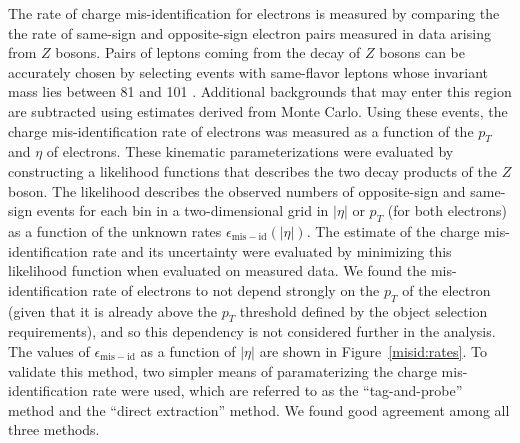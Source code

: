 The rate of charge mis-identification for electrons is measured by comparing the the rate of same-sign and opposite-sign electron pairs measured in data arising from $Z$ bosons.
Pairs of leptons coming from the decay of $Z$ bosons can be accurately chosen by selecting events with same-flavor leptons whose invariant mass lies between 81 \GeV{} and 101 \GeV{}.
Additional backgrounds that may enter this region are subtracted using estimates derived from Monte Carlo.
Using these events, the charge mis-identification rate of electrons was measured as a function of the $p_T$ and $\eta$ of electrons.
These kinematic parameterizations were evaluated by constructing a likelihood functions that describes the two decay products of the $Z$ boson.
The likelihood describes the observed numbers of opposite-sign and same-sign events for each bin in a two-dimensional grid in $|\eta|$ or $p_T$ (for both electrons) as a function of the unknown rates $\epsilon_{\mathrm{mis-id}}(|\eta|)$.
The estimate of the charge mis-identification rate and its uncertainty were evaluated by minimizing this likelihood function when evaluated on measured data.
We found the mis-identification rate of electrons to not depend strongly on the $p_T$ of the electron (given that it is already above the $p_T$ threshold defined by the object selection requirements), and so this dependency is not considered further in the analysis.
The values of $\epsilon_{\mathrm{mis-id}}$ as a function of $|\eta|$ are shown in Figure~\ref{misid:rates}.
To validate this method, two simpler means of paramaterizing the charge mis-identification rate were used, which are referred to as the ``tag-and-probe'' method and the ``direct extraction'' method.
We found good agreement among all three methods. 



